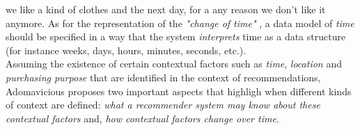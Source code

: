 we like a kind of clothes and the next day, for a any reason we don't
like it anymore. As for the representation of the \textit{"change of time"} , a data 
model of \textit{time} should be specified in a way that the system
\textit{interprets} time as a data structure (for instance weeks, 
days, hours, minutes, seconds, etc.). \\
Assuming the existence of certain contextual factors such as
\textit{time}, \textit{location} and \textit{purchasing purpose} that
are identified in the context of recommendations,
Adomavicious\cite{adomavicius2011context} proposes two important
aspects that highligh when different kinds of context are defined:
\textit{what a recommender system may know about these contextual
factors} and, \textit{how contextual factors change over time}.\\ \\

